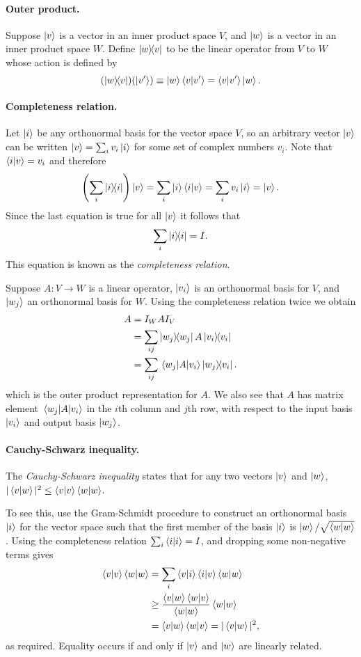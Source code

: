 \documentclass{article}
\numberwithin{theorem}{section}
\numberwithin{corollary}{section}
\numberwithin{postulate}{section}
\begin{document}
\paragraph{Outer product.} Suppose $\ket{v}$ is a vector in an inner product
space $V$, and $\ket{w}$ is a vector in an inner product space $W$. Define
$\op{w}{v}$ to be the linear operator from $V$ to $W$ whose action is defined
by \[
  (\op{w}{v})(\ket{v'}) \equiv \ket{w}\ip{v}{v'} = \ip{v}{v'}\ket{w}.
\]

\paragraph{Completeness relation.} Let $\ket{i}$ be any orthonormal basis for
the vector space $V$, so an arbitrary vector $\ket{v}$ can be written $\ket{v}
= \sum_i v_i\ket{i}$ for some set of complex numbers $v_i$. Note that
$\ip{i}{v} = v_i$ and therefore \[
  \left(\sum_i \op{i}{i}\right)\ket{v} = \sum_i \ket{i}\ip{i}{v} =
  \sum_i v_i\ket{i} = \ket{v}.
\] Since the last equation is true for all $\ket{v}$ it follows that \[
  \sum_i \op{i}{i} = I.
\]
This equation is known as the \emph{completeness relation}.

Suppose $A: V \to W$ is a linear operator, $\ket{v_i}$ is an orthonormal basis
for $V$, and $\ket{w_j}$ an orthonormal basis for $W$. Using the completeness
relation twice we obtain
\begin{align*}
  A &= I_WAI_V \\
    &= \sum_{ij} \op{w_j}{w_j}A\op{v_i}{v_i} \\
    &= \sum_{ij} \mel{w_j}{A}{v_i}\op{w_j}{v_i}.
\end{align*}
which is the outer product representation for $A$. We also see that $A$ has
matrix element $\mel{w_j}{A}{v_i}$ in the $i$th column and $j$th row, with
respect to the input basis $\ket{v_i}$ and output basis $\ket{w_j}$.

\paragraph{Cauchy-Schwarz inequality.} The \emph{Cauchy-Schwarz inequality}
states that for any two vectors $\ket{v}$ and $\ket{w}$, $|\ip{v}{w}|^2 \leq
\ip{v}\ip{w}$.

To see this, use the Gram-Schmidt procedure to construct an orthonormal basis
$\ket{i}$ for the vector space such that the first member of the basis
$\ket{i}$ is $\ket{w}/\sqrt{\ip{w}}$. Using the completeness relation $\sum_i
\ip{i} = I$, and dropping some non-negative terms gives
\begin{align*}
  \ip{v}\ip{w}
  &= \sum_i \ip{v}{i}\ip{i}{v}\ip{w} \\
  &\geq \frac{\ip{v}{w}\ip{w}{v}}{\ip{w}}\ip{w} \\
  &= \ip{v}{w}\ip{w}{v} = |\ip{v}{w}|^2,
\end{align*}
as required. Equality occurs if and only if $\ket{v}$ and $\ket{w}$ are
linearly related.
\end{document}
